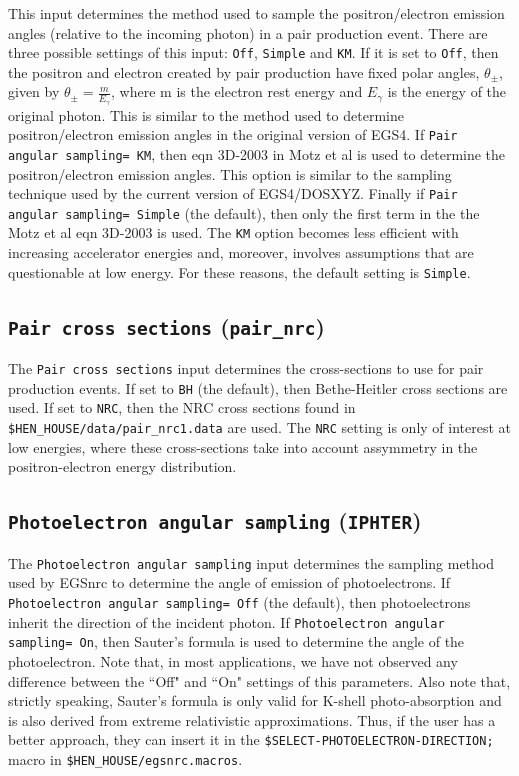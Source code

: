 \documentclass[12pt,twoside]{article}      %
\begin{document}
This input determines the method used to sample the positron/electron emission
angles (relative to the incoming photon) in a pair production event.  There
are three possible settings of this input: {\tt Off}, {\tt Simple} and {\tt KM}.
If it is set to {\tt Off}, then the positron and electron created by pair
production have fixed polar angles, $\theta_{\pm}$, given by
$\theta_{\pm}=\frac{m}{E_{\gamma}}$, where m is the electron rest energy
and $E_{\gamma}$
 is the energy of the original photon.  This is similar to the method used to determine
positron/electron emission angles in the original version of EGS4.
If {\tt Pair angular sampling= KM}, then eqn 3D-2003 in
Motz et al\cite{Mo69} is used to determine the positron/electron emission
angles.  This option is similar to the sampling technique used by the current
version of EGS4/DOSXYZ.  Finally if {\tt Pair angular sampling= Simple} (the default), then only
the first term in the the Motz et al eqn 3D-2003 is used.  The {\tt KM} option
becomes less efficient with increasing accelerator energies and, moreover, involves
assumptions that are questionable at low energy.  For these reasons, the default
setting is {\tt Simple}.


\subsection{ {\tt Pair cross sections} ({\tt pair\_nrc})}

The {\tt Pair cross sections} input determines the cross-sections to
use for pair production events.  If set to {\tt BH} (the default), then
Bethe-Heitler cross sections are used.  If set to {\tt NRC}, then the
NRC cross sections found in {\tt \$HEN\_HOUSE/data/pair\_nrc1.data} are
used.  The {\tt NRC} setting is only of interest at low energies, where
these cross-sections take into account assymmetry in the positron-electron
energy distribution.

\subsection{{\tt Photoelectron angular sampling} ({\tt IPHTER})}

The {\tt Photoelectron angular sampling} input determines the sampling method
used by EGSnrc to determine the angle of emission of photoelectrons.
If {\tt Photoelectron angular sampling= Off} (the default), then
 photoelectrons inherit the direction of the incident photon.  If
{\tt Photoelectron angular sampling= On}, then Sauter's formula
\cite{Sa31} is used to determine the angle of the photoelectron.  Note
that, in most applications, we have not observed any difference between
the ``Off" and ``On" settings of this parameters.  Also note that,
strictly speaking, Sauter's formula is only valid for K-shell photo-absorption
and is also derived from extreme relativistic approximations.  Thus, if
the user has a better approach, they can insert it in the
{\tt \$SELECT-PHOTOELECTRON-DIRECTION;} macro in
{\tt \$HEN\_HOUSE/egsnrc.macros}.
\end{document}
